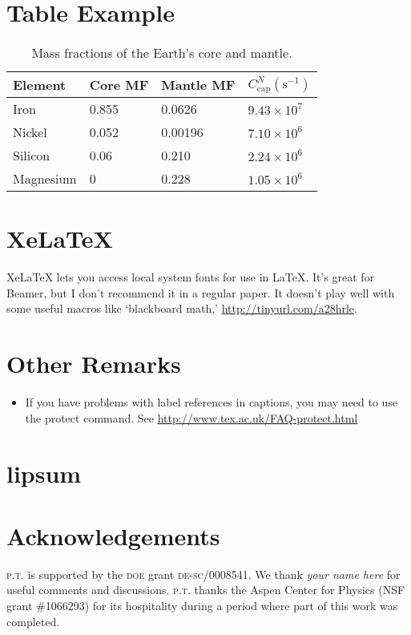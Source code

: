 \documentclass[12pt]{article}
\numberwithin{equation}{section}
\newcommand{\acro}[1]{\textsc{\MakeLowercase{#1}}}
\begin{document}
\section{Table Example}

 
\begin{table}
	\renewcommand{\arraystretch}{1.3} %
	\centering
	\begin{tabular}{ @{} llll @{} } \toprule %
		Element & Core MF & Mantle MF & $C_\text{cap}^N (\text{s}^{-1})$ 
		\\ \hline
		Iron & 0.855 & 0.0626 & $9.43\times 10^{7}$ 
		\\
		Nickel & 0.052 & 0.00196 & $7.10\times 10^{6}$ 
		\\
		Silicon & 0.06 & 0.210 & $2.24\times 10^{6}$ 
		\\
		Magnesium & 0 & 0.228 & $1.05\times 10^{6}$ 
		\\ \bottomrule
	\end{tabular}
	\caption{
		Mass fractions of the Earth's core and mantle.
		\label{table:elements}
	}
\end{table}


 

\section{XeLaTeX}

XeLaTeX lets you access local system fonts for use in \LaTeX. It's great for Beamer, but I don't recommend it in a regular paper. It doesn't play well with some useful macros like `blackboard math,' \url{http://tinyurl.com/a28hrle}.

\section{Other Remarks}

\begin{itemize}
	\item If you have problems with label references in captions, you may need to use the protect command. See \url{http://www.tex.ac.uk/FAQ-protect.html}
\end{itemize}

\section{lipsum}
 
 \lipsum[3-5]

\section*{Acknowledgements}


\acro{p.t.} is supported by the \acro{DOE} grant \textsc{de-sc}/0008541.
%
We thank
\emph{your name here}
for useful comments and discussions. 
%
\textsc{p.t.} thanks the Aspen Center for Physics (NSF grant \#1066293) for its hospitality during a period where part of this work was completed.



% 
\end{document}
